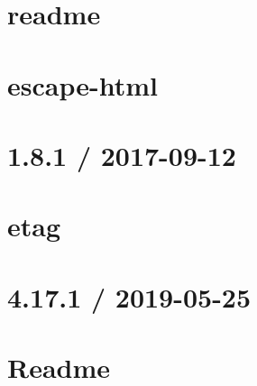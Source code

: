 \let\mypdfximage\pdfximage\def\pdfximage{\immediate\mypdfximage}\documentclass[twoside]{book}
\newcommand{\+}{\discretionary{\mbox{\scriptsize$\hookleftarrow$}}{}{}}
\begin{document}
\chapter{readme}
\label{md__c_1__git_hub__p_r_o_y_e_c_t_o-_i_i_i-_g_o_t_rest-api_node_modules_escape-goat_readme}

\chapter{escape-\/html}
\label{md__c_1__git_hub__p_r_o_y_e_c_t_o-_i_i_i-_g_o_t_rest-api_node_modules_escape-html__readme}

\chapter{1.8.1 / 2017-\/09-\/12}
\label{md__c_1__git_hub__p_r_o_y_e_c_t_o-_i_i_i-_g_o_t_rest-api_node_modules_etag__h_i_s_t_o_r_y}

\chapter{etag}
\label{md__c_1__git_hub__p_r_o_y_e_c_t_o-_i_i_i-_g_o_t_rest-api_node_modules_etag__r_e_a_d_m_e}

\chapter{4.17.1 / 2019-\/05-\/25}
\label{md__c_1__git_hub__p_r_o_y_e_c_t_o-_i_i_i-_g_o_t_rest-api_node_modules_express__history}

\chapter{Readme}
\label{md__c_1__git_hub__p_r_o_y_e_c_t_o-_i_i_i-_g_o_t_rest-api_node_modules_express__readme}

\end{document}
